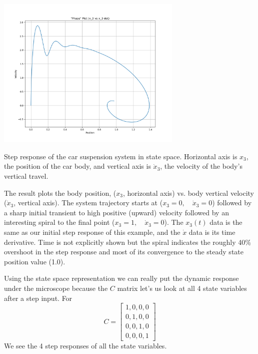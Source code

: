 \begin{ExampleCont}

\begin{center}
    \includegraphics[width=3.5in]{figs08/py_phase_plot.png}

     {Step response of the car suspension system in state space.  Horizontal axis is $x_3$, the position of the car body, and vertical axis is $\dot{x}_3$, the velocity of the body's vertical travel.}\label{graphstatespacespiral}
\end{center}

The result  plots the body position, ($x_3$, horizontal axis) vs. body vertical velocity ($\dot{x}_3$, vertical axis).  The system trajectory starts at ($x_3=0, \quad \dot{x}_3=0$) followed by a sharp initial transient to high positive (upward)
velocity followed by an interesting spiral to the final point ($x_3=1, \quad\dot{x}_3=0$).
The $x_3(t)$ data is the same as our initial step response of this example,
and the $\dot{x}$ data is its time derivative.
Time is not explicitly shown but the spiral indicates the roughly 40\%
overshoot in the step
response and most of its convergence to the steady state position value (1.0).

Using the state space representation we can really put the dynamic response under the microscope because the $C$ matrix let's us look at all 4 state variables after a step
input. For
\[ C = \begin{bmatrix} 1, 0, 0, 0 \\ 0, 1, 0, 0 \\ 0, 0, 1, 0 \\ 0, 0, 0, 1\end{bmatrix}
\]
We see the 4 step responses of all the state variables.

\end{ExampleCont}
